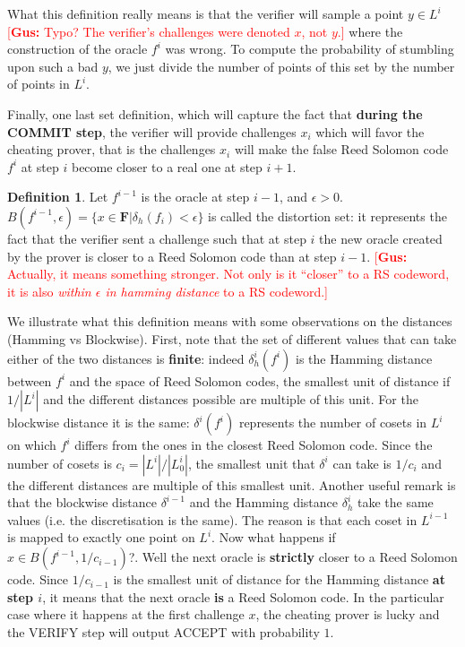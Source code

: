\documentclass[12pt]{extarticle}
\newcommand{\<}{\langle}
\renewcommand{\>}{\rangle}
\theoremstyle{definition}
\newcommand{\gus}[1]{\textcolor{red}{[\textbf{Gus:} #1]}}
\newtheorem{defn}{Definition}
\begin{document}
What this definition really means is that the verifier will sample a point $y\in L^i$ \gus{Typo?  The verifier's challenges were denoted $x$, not $y$.} where the construction of the oracle $f^i$ was wrong. To compute the probability of stumbling upon such a bad $y$, we just divide the number of points of this set by the number of points in $L^i$.

Finally, one last set definition, which will capture the fact that \textbf{during the COMMIT step}, the verifier will provide challenges $x_i$ which will favor the cheating prover, that is the challenges $x_i$ will make the false Reed Solomon code $f^i$ at step $i$ become closer to a real one at step $i+1$.

\begin{defn}
Let $f^{i-1}$ is the oracle at step $i-1$, and $\epsilon>0$. $B(f^{i-1},\epsilon)=\{x\in\mathbf{F}|\delta_h(f_i)<\epsilon\}$ is called the distortion set: it represents the fact that the verifier sent a challenge such that at step $i$ the new oracle created by the prover is closer to a Reed Solomon code than at step $i-1$.
\gus{Actually, it means something stronger.  Not only is it ``closer'' to a RS codeword, it is also \textit{within $\epsilon$ in hamming distance} to a RS codeword.}
\end{defn}
We illustrate what this definition means with some observations on the distances (Hamming vs Blockwise). First, note that the set of different values that can take either of the two distances is \textbf{finite}: indeed $\delta^i_h(f^i)$ is the Hamming distance between $f^i$ and the space of Reed Solomon codes, the smallest unit of distance if $1/|L^i|$ and the different distances possible are multiple of this unit. For the blockwise distance it is the same: $\delta^i(f^i)$ represents the number of cosets in $L^i$ on which $f^i$ differs from the ones in the closest Reed Solomon code. Since the number of cosets is $c_i=|L^i|/|L^i_0|$, the smallest unit that $\delta^i$ can take is $1/c_i$ and the different distances are multiple of this smallest unit. Another useful remark is that the blockwise distance $\delta^{i-1}$ and the Hamming distance $\delta^i_h$ take the same values (i.e. the discretisation is the same). The reason is that each coset in $L^{i-1}$ is mapped to exactly one point on $L^i$. Now what happens if $x\in B(f^{i-1},1/c_{i-1})$?. Well the next oracle is \textbf{strictly} closer to a Reed Solomon code. Since $1/c_{i-1}$ is the smallest unit of distance for the Hamming distance \textbf{at step $i$}, it means that the next oracle \textbf{is} a Reed Solomon code. In the particular case where it happens at the first challenge $x$, the cheating prover is lucky and the VERIFY step will output ACCEPT with probability $1$.
\end{document}
